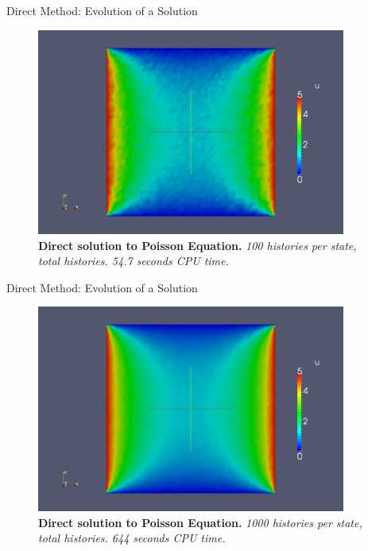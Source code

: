 \documentclass{beamer}
\begin{document}
\begin{frame}{Direct Method: Evolution of a Solution}

  \begin{figure}[h!]
    \begin{center}
      \includegraphics[width=4in]{direct_100.png}
    \end{center}
    \caption{\textbf{Direct solution to Poisson Equation.}
      \textit{100 histories per state,  total
        histories. 54.7 seconds CPU time.} }
  \end{figure}

\end{frame}

\begin{frame}{Direct Method: Evolution of a Solution}

  \begin{figure}[h!]
    \begin{center}
      \includegraphics[width=4in]{direct_1000.png}
    \end{center}
    \caption{\textbf{Direct solution to Poisson Equation.} \textit{1000
        histories per state,  total histories. 644 seconds
        CPU time.} }
  \end{figure}

\end{frame}
\end{document}
